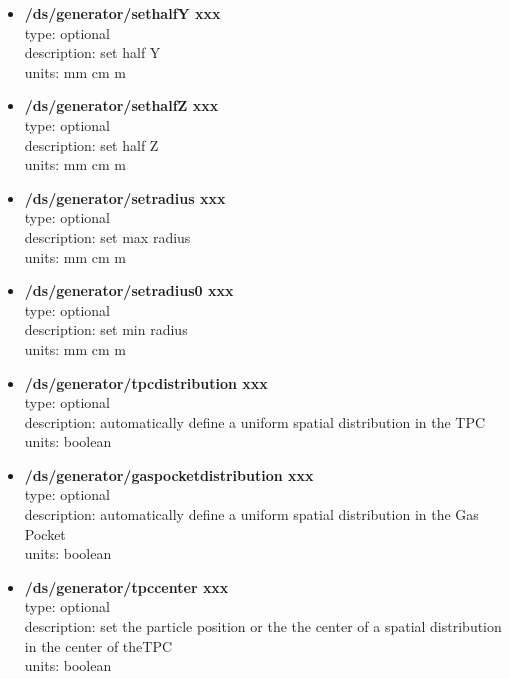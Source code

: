 \documentclass[twocolumn, 10pt]{article}
\begin{document}
\begin{itemize}
\item \textbf{/ds/generator/sethalfY xxx}\\
type: optional \\
description: set half Y\\
units: mm cm m\\

\item \textbf{/ds/generator/sethalfZ xxx}\\
type: optional \\
description: set half Z\\
units: mm cm m\\

\item \textbf{/ds/generator/setradius xxx}\\
type: optional \\
description: set max radius\\
units: mm cm m\\

\item \textbf{/ds/generator/setradius0 xxx}\\
type: optional \\
description: set min radius\\
units: mm cm m\\

\item \textbf{/ds/generator/tpcdistribution xxx}\\
type: optional \\
description: automatically define a uniform spatial distribution in the TPC\\
units: boolean\\

\item \textbf{/ds/generator/gaspocketdistribution xxx}\\
type: optional \\
description: automatically define a uniform spatial distribution in the Gas Pocket\\
units: boolean\\

\item \textbf{/ds/generator/tpccenter xxx}\\
type: optional \\
description: set the particle position or the the center of a spatial distribution in the center of theTPC\\
units: boolean\\


\end{itemize}
\end{document}
